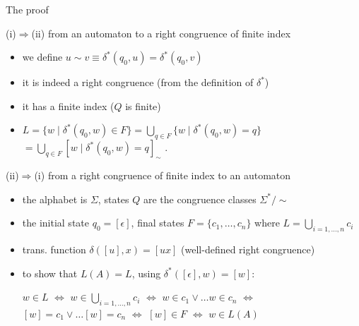 \documentclass[handout]{beamer}
\begin{document}
\begin{frame}{The proof}

    \alert{(i){\Large$\Rightarrow$}(ii)} from an automaton to a right congruence of finite index
    \vspace{-6pt}
    \begin{itemize}
        \item we define \alert{$u\sim v \equiv \delta^*(q_0,u)=\delta^*(q_0,v)$}
        \item it is indeed a right congruence (from the definition of  $\delta^*$)
        \item it has a finite index ($Q$ is finite)
        \item $L=\{w \mid \delta^*(q_0,w)\in F\}=\bigcup_{q\in F}\{w\mid \delta^*(q_0,w)=q\}$ {$ =\bigcup_{q\in F} [w \mid \delta^*(q_0,w)=q]_\sim$} .
    \end{itemize}

    \vspace{-6pt}
    \alert{(ii){\Large$\Rightarrow$}(i)} from a right congruence of finite index to an automaton
    \vspace{-6pt}
    \begin{itemize}
        \item the alphabet is $\Sigma$, states \alert{$Q$ are the congruence classes $\Sigma^*/\sim$}
        \item the initial state $q_0=[\epsilon]$, final states $F=\{c_1, \ldots, c_n\}$ where $L=\bigcup_{i=1,\ldots,n}c_i$
        \item trans. function \alert{$\delta([u],x)=[ux]$} {(well-defined right congruence)}
        \item to show that $L(A)=L$, using $\delta^*([\epsilon],w)=[w]$: 
        
        \alert{$w\in L$} $\Leftrightarrow$ $w\in \bigcup_{i=1,\ldots,n}c_i$ $\Leftrightarrow$ $w\in c_1 \vee \ldots w\in c_n$ $\Leftrightarrow$ $[w]=c_1 \vee \ldots [w]=c_n$ $\Leftrightarrow$ $[w]\in F$ $\Leftrightarrow$ \alert{$w\in L(A)$}
        \hfill\qedsymbol
    \end{itemize}

\end{frame}
\end{document}

